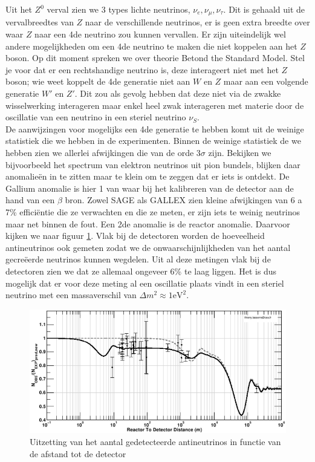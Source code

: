 \documentclass[../main.tex]{subfiles}
\begin{document}
Uit het $Z^0$ verval zien we 3 types lichte neutrinos, $\nu_e,\nu_\mu,\nu_\tau$. Dit is gehaald uit de vervalbreedtes van $Z$ naar de verschillende neutrinos, er is geen extra breedte over waar $Z$ naar een 4de neutrino zou kunnen vervallen. Er zijn uiteindelijk wel andere mogelijkheden om een 4de neutrino te maken die niet koppelen aan het $Z$ boson. Op dit moment spreken we over theorie Betond the Standard Model. Stel je voor dat er een rechtshandige neutrino is, deze interageert niet met het $Z$ boson; wie weet koppelt de 4de generatie niet aan $W$ en $Z$ maar aan een volgende generatie $W'$ en $Z'$. Dit zou als gevolg hebben dat deze niet via de zwakke wisselwerking interageren maar enkel heel zwak interageren met materie door de oscillatie van een neutrino in een steriel neutrino $\nu_S$.\\
De aanwijzingen voor mogelijks een 4de generatie te hebben komt uit de weinige statistiek die we hebben in de experimenten. Binnen de weinige statistiek de we hebben zien we allerlei afwijkingen die van de orde $3\sigma$ zijn. Bekijken we bijvoorbeeld het spectrum van elektron neutrinos uit pion bundels, blijken daar anomalieën in te zitten maar te klein om te zeggen dat er iets is ontdekt. De Gallium anomalie is hier 1 van waar bij het kalibreren van de detector aan de hand van een $\beta$ bron. Zowel SAGE als GALLEX zien kleine afwijkingen van 6 a 7\% efficiëntie die ze verwachten en die ze meten, er zijn iets te weinig neutrinos maar net binnen de fout. Een 2de anomalie is de reactor anomalie. Daarvoor kijken we naar figuur \ref{fig:neutrinos/reactor_anomalie}. Vlak bij de detectoren worden de hoeveelheid antineutrinos ook gemeten zodat we de onwaarschijnlijkheden van het aantal gecreëerde neutrinos kunnen wegdelen. Uit al deze metingen vlak bij de detectoren zien we dat ze allemaal ongeveer 6\% te laag liggen. Het is dus mogelijk dat er voor deze meting al een oscillatie plaats vindt in een steriel neutrino met een massaverschil van $\Delta m^2\approx 1\text{eV}^2$.

\begin{figure}[h]
    \centering
    \includegraphics[width=0.7\linewidth]{neutrinos/reactor_anomalie.png}
    \caption{Uitzetting van het aantal gedetecteerde antineutrinos in functie van de afstand tot de detector}%
    \label{fig:neutrinos/reactor_anomalie}
\end{figure}
\end{document}
